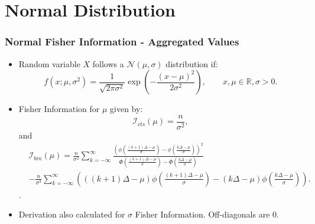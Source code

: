 \documentclass[11pt]{beamer}
\begin{document}
\section{Normal Distribution}

\begingroup
\small
\begin{frame}
	\frametitle{Normal Fisher Information - Aggregated Values}
	\begin{itemize}
	\item Random variable $X$ follows a $\mathcal{N}(\mu, \sigma)$ distribution if:
	\begin{equation*}
		f(x; \mu, \sigma^2) = \frac{1}{\sqrt{2 \pi \sigma^2}} \exp\left(-\frac{(x - \mu)^2}{2 \sigma^2} \right), \quad \quad x, \mu \in \mathbb{R}, \sigma > 0.
	\end{equation*}
	\item Fisher Information for $\mu$ given by:
	\begin{equation*}
			\mathcal{I}_{cts}(\mu) = \frac{n}{\sigma^2},
	\end{equation*}
	and
	\begin{equation*}
		\begin{aligned}
			&\mathcal{I}_{bin}(\mu) = \frac{n}{\sigma^2} \sum_{k=-\infty}^\infty 
			 \frac{\left(\phi \left( \frac{(k + 1) \Delta - \mu}{\sigma} \right) - \phi \left( \frac{k \Delta - \mu}{\sigma} \right)\right)^2}
			 {\Phi \left( \frac{(k + 1) \Delta - \mu}{\sigma} \right) - \Phi \left(\frac{k \Delta - \mu}{\sigma} \right)}
			  \\
			&- \frac{n}{\sigma^3} \sum_{k=-\infty}^\infty \left(
				((k + 1) \Delta - \mu) \phi \left( \frac{(k + 1) \Delta - \mu}{\sigma} \right) - (k \Delta - \mu) \phi \left( \frac{k \Delta - \mu}{\sigma} \right)
			\right).
		\end{aligned}
	\end{equation*}.
	\item Derivation also calculated for $\sigma$ Fisher Information. Off-diagonals are 0.
	\end{itemize}
\end{frame}
\endgroup
\end{document}
